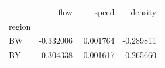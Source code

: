 \begin{tabular}{lrrr}
\toprule
 & flow & speed & density \\
region &  &  &  \\
\midrule
BW & -0.332006 & 0.001764 & -0.289811 \\
BY & 0.304338 & -0.001617 & 0.265660 \\
\bottomrule
\end{tabular}
